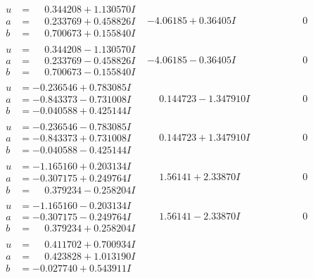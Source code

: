 \documentclass[1p]{elsarticle_modified}
\theoremstyle{definition}
\begin{document}
$$\begin{array}{c|c|c}
\begin{aligned}
u &= \phantom{-}0.344208 + 1.130570 I \\
a &= \phantom{-}0.233769 + 0.458826 I \\
b &= \phantom{-}0.700673 + 0.155840 I\end{aligned}
 & -4.06185 + 0.36405 I & \phantom{-0.000000 } 0 \\ \hline\begin{aligned}
u &= \phantom{-}0.344208 - 1.130570 I \\
a &= \phantom{-}0.233769 - 0.458826 I \\
b &= \phantom{-}0.700673 - 0.155840 I\end{aligned}
 & -4.06185 - 0.36405 I & \phantom{-0.000000 } 0 \\ \hline\begin{aligned}
u &= -0.236546 + 0.783085 I \\
a &= -0.843373 - 0.731008 I \\
b &= -0.040588 + 0.425144 I\end{aligned}
 & \phantom{-}0.144723 - 1.347910 I & \phantom{-0.000000 } 0 \\ \hline\begin{aligned}
u &= -0.236546 - 0.783085 I \\
a &= -0.843373 + 0.731008 I \\
b &= -0.040588 - 0.425144 I\end{aligned}
 & \phantom{-}0.144723 + 1.347910 I & \phantom{-0.000000 } 0 \\ \hline\begin{aligned}
u &= -1.165160 + 0.203134 I \\
a &= -0.307175 + 0.249764 I \\
b &= \phantom{-}0.379234 - 0.258204 I\end{aligned}
 & \phantom{-}1.56141 + 2.33870 I & \phantom{-0.000000 } 0 \\ \hline\begin{aligned}
u &= -1.165160 - 0.203134 I \\
a &= -0.307175 - 0.249764 I \\
b &= \phantom{-}0.379234 + 0.258204 I\end{aligned}
 & \phantom{-}1.56141 - 2.33870 I & \phantom{-0.000000 } 0 \\ \hline\begin{aligned}
u &= \phantom{-}0.411702 + 0.700934 I \\
a &= \phantom{-}0.423828 + 1.013190 I \\
b &= -0.027740 + 0.543911 I\end{aligned}

\end{array}$$
\end{document}
